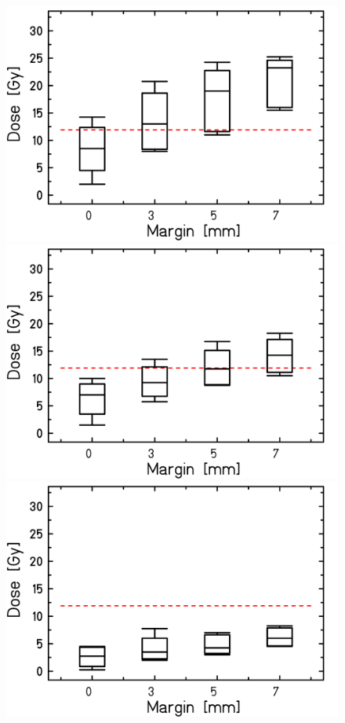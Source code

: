 \begin{figure}[H]
\begin{minipage}{0.31\textwidth}
  \includegraphics[width=\textwidth]{./teile/results_human/Whisker_ESO_alternativeLimit_ITV.png}
\end{minipage}
\hfill
\begin{minipage}{0.31\textwidth}
  \includegraphics[width=\textwidth]{./teile/results_human/Whisker_ESO_alternativeLimit_IMPT_woOverlap.png}
\end{minipage}
\hfill
\begin{minipage}{0.31\textwidth}
  \includegraphics[width=\textwidth]{./teile/results_human/Whisker_ESO_alternativeLimit_IMPT_woOverlap_otherParameters.png}

\end{minipage}
\end{figure}
